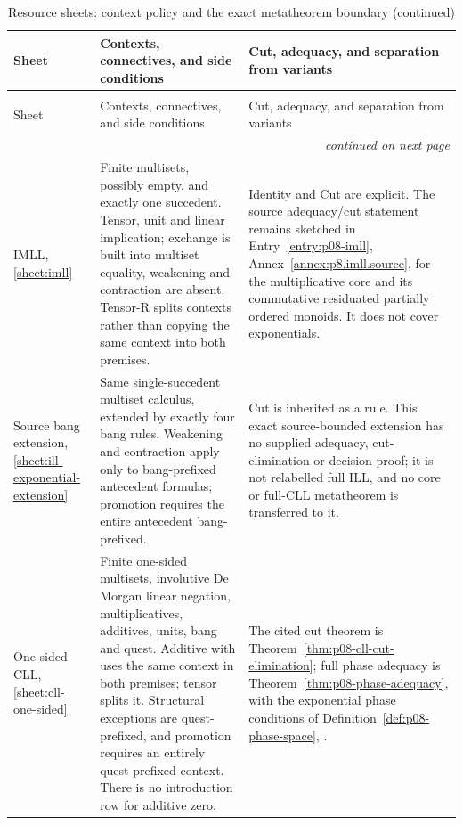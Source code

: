 \begingroup\small
\begin{longtable}{@{}p{.18\linewidth}p{.36\linewidth}p{.38\linewidth}@{}}
\caption{Resource sheets: context policy and the exact metatheorem boundary.}
\label{tab:p14-nonclassical-resources}\\
\toprule
Sheet & Contexts, connectives, and side conditions & Cut, adequacy, and separation from variants \\
\midrule\endfirsthead
\caption[]{Resource sheets: context policy and the exact metatheorem boundary (continued)}\\
\toprule Sheet & Contexts, connectives, and side conditions & Cut, adequacy, and separation from variants \\
\midrule\endhead
\midrule\multicolumn{3}{r}{\emph{continued on next page}}\\
\endfoot
\endlastfoot
IMLL, \ref{sheet:imll} & Finite multisets, possibly empty, and exactly one
succedent. Tensor, unit and linear implication; exchange is built into
multiset equality, weakening and contraction are absent. Tensor-R splits
contexts rather than copying the same context into both premises. &
Identity and Cut are explicit. The source adequacy/cut statement remains
sketched in Entry~\ref{entry:p08-imll}, Annex~\ref{annex:p8.imll.source},
for the multiplicative core and its commutative residuated partially ordered
monoids. It does not cover exponentials. \\
\addlinespace
Source bang extension, \ref{sheet:ill-exponential-extension} & Same
single-succedent multiset calculus, extended by exactly four bang rules.
Weakening and contraction apply only to bang-prefixed antecedent formulas;
promotion requires the entire antecedent bang-prefixed. & Cut is inherited
as a rule. This exact source-bounded extension has no supplied adequacy,
cut-elimination or decision proof; it is not relabelled full ILL, and no
core or full-CLL metatheorem is transferred to it. \\
\addlinespace
One-sided CLL, \ref{sheet:cll-one-sided} & Finite one-sided multisets,
involutive De Morgan linear negation, multiplicatives, additives, units,
bang and quest. Additive with uses the same context in both premises;
tensor splits it. Structural exceptions are quest-prefixed, and promotion
requires an entirely quest-prefixed context. There is no introduction row
for additive zero. & The cited cut theorem is
Theorem~\ref{thm:p08-cll-cut-elimination}; full phase adequacy is
Theorem~\ref{thm:p08-phase-adequacy}, with the exponential phase conditions
of Definition~\ref{def:p08-phase-space}, \cite{Girard1995}.

\end{longtable}
